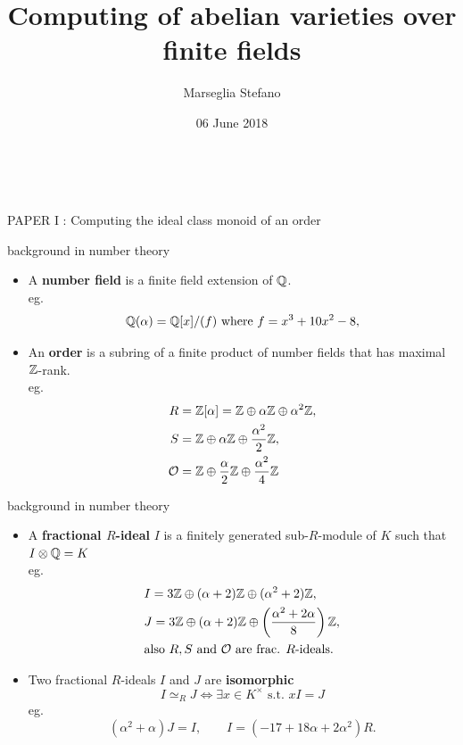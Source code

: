 \documentclass{beamer}
\title[]{Computing of abelian varieties over finite fields}
\author[Marseglia Stefano]{Marseglia Stefano}
\institute[]{Stockholm University}
\date{06 June 2018}
\begin{document}
\begin{frame}
\titlepage
\end{frame}

\begin{frame}{\ }
\begin{center}
\Large
   PAPER I : Computing the ideal class monoid of an order
\end{center}
\end{frame}

\begin{frame}{background in number theory}
\begin{itemize}
   \pause \item A \textbf{number field} is a finite field extension of $\mathbb{Q}$.\\
	 eg. \[\mathbb{Q}(\alpha) = \mathbb{Q}[x]/(f) \text{ where } f=x^3+10x^2-8,\]
   \pause \item An \textbf{order} is a subring of a finite product of number fields that has maximal $\mathbb{Z}$-rank.\\
   \pause eg.
	    \begin{align*}
	      R & =\mathbb{Z}[\alpha] = \mathbb{Z} \oplus \alpha \mathbb{Z} \oplus \alpha^2 \mathbb{Z}, \\
	      S & = \mathbb{Z} \oplus \alpha \mathbb{Z} \oplus \frac{\alpha^2}{2} \mathbb{Z}, \\
	      {\mathcal O} & = \mathbb{Z} \oplus \frac{\alpha}{2} \mathbb{Z} \oplus \frac{\alpha^2}{4} \mathbb{Z}
	    \end{align*}
\end{itemize}
\end{frame}

\begin{frame}{background in number theory}
\begin{itemize}
   \item A \textbf{fractional $R$-ideal} $I$ is a finitely generated sub-$R$-module of $K$ such that $I\otimes \mathbb{Q}=K$\\
	\pause  eg. \begin{align*}
		& I = 3\mathbb{Z}\oplus (\alpha+2)\mathbb{Z} \oplus (\alpha^2+2)\mathbb{Z}, \\
	        & J = 3\mathbb{Z}\oplus (\alpha+2)\mathbb{Z} \oplus \left(\frac{\alpha^2+2\alpha}{8}\right)\mathbb{Z},\\
	        & \text{also $R, S$ and ${\mathcal O}$ are frac. $R$-ideals.}
	     \end{align*}
    \pause \item Two fractional $R$-ideals $I$ and $J$ are \textbf{isomorphic}
	 \[ I\simeq_R J \Longleftrightarrow \exists x \in K^\times \text{ s.t.~} xI=J \]
	 eg. \[ (\alpha^2+\alpha)J = I , \qquad I = (-17+18\alpha+2\alpha^2)R. \]
\end{itemize}
\end{frame}
\end{document}
